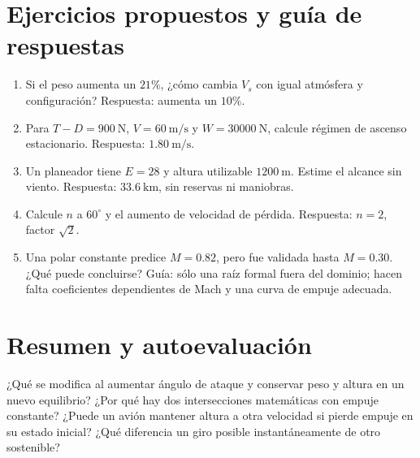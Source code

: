 \section{Ejercicios propuestos y guía de respuestas}
\begin{enumerate}
\item Si el peso aumenta un $21\%$, ¿cómo cambia $V_s$ con igual atmósfera y configuración? Respuesta: aumenta un $10\%$.
\item Para $T-D=900\ \mathrm N$, $V=60\ \mathrm{m/s}$ y $W=30000\ \mathrm N$, calcule régimen de ascenso estacionario. Respuesta: $1.80\ \mathrm{m/s}$.
\item Un planeador tiene $E=28$ y altura utilizable $1200\ \mathrm m$. Estime el alcance sin viento. Respuesta: $33.6\ \mathrm{km}$, sin reservas ni maniobras.
\item Calcule $n$ a $60^\circ$ y el aumento de velocidad de pérdida. Respuesta: $n=2$, factor $\sqrt2$.
\item Una polar constante predice $M=0.82$, pero fue validada hasta $M=0.30$. ¿Qué puede concluirse? Guía: sólo una raíz formal fuera del dominio; hacen falta coeficientes dependientes de Mach y una curva de empuje adecuada.
\end{enumerate}
\section{Resumen y autoevaluación}
¿Qué se modifica al aumentar ángulo de ataque y conservar peso y altura en un nuevo equilibrio? ¿Por qué hay dos intersecciones matemáticas con empuje constante? ¿Puede un avión mantener altura a otra velocidad si pierde empuje en su estado inicial? ¿Qué diferencia un giro posible instantáneamente de otro sostenible?


\studiumchaptercheck

